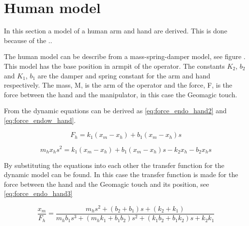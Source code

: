 \section{Human model}
In this section a model of a human arm and hand are derived. This is done because of the ..

The human model can be describe from a mass-spring-damper model, see figure . This model has the base position in armpit of the operator. The constants $K_2$, $b_2$ and $K_1$, $b_1$ are the damper and spring constant for the arm and hand respectively. The mass, M, is the arm of the operator and the force, F, is the force between the hand and the manipulator, in this case the Geomagic touch.




From  the dynamic equations can be derived as \eqref{eq:force_endo_hand2} and \eqref{eq:force_endow_hand}.

\begin{equation}
F_h = k_1(x_m-x_h)+b_1(x_m-x_h)s
\label{eq:force_endo_hand2}
\end{equation}

\begin{equation}
m_hx_hs^2 = k_1(x_m-x_h)+b_1(x_m-x_h)s-k_2x_h-b_2x_hs
\label{eq:force_endow_hand}
\end{equation}

By substituting the equations into each other the transfer function for the dynamic model can be found. In this case the transfer function is made for the force between the hand and the Geomagic touch and its position, see \eqref{eq:force_endo_hand3}

\begin{equation}
\frac{x_m}{F_h} = \frac{m_hs^2+(b_2+b_1)s+(k_2+k_1)}{m_hb_1s^3+(m_hk_1+b_1b_2)s^2+(k_1b_2+b_1k_2)s+k_2k_1}
\label{eq:force_endo_hand3}
\end{equation}